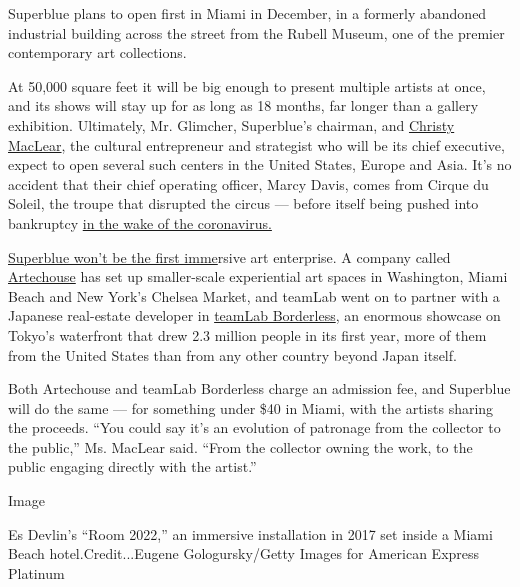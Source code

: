 Superblue plans to open first in Miami in December, in a formerly
abandoned industrial building across the street from the Rubell Museum,
one of the premier contemporary art collections.

At 50,000 square feet it will be big enough to present multiple artists
at once, and its shows will stay up for as long as 18 months, far longer
than a gallery exhibition. Ultimately, Mr. Glimcher, Superblue's
chairman, and \href{https://www.youtube.com/watch?v=_aC5tn6jKzk}{Christy
MacLear}, the cultural entrepreneur and strategist who will be its chief
executive, expect to open several such centers in the United States,
Europe and Asia. It's no accident that their chief operating officer,
Marcy Davis, comes from Cirque du Soleil, the troupe that disrupted the
circus --- before itself being pushed into bankruptcy
\href{https://www.nytimes3xbfgragh.onion/2020/05/17/world/canada/cirque-du-soleil-coronavirus-debt.html}{in
the wake of the coronavirus.}

\href{https://www.nytimes3xbfgragh.onion/2020/05/17/world/canada/cirque-du-soleil-coronavirus-debt.html}{Superblue
won't be the first imme}rsive art enterprise. A company called
\href{https://www.nytimes3xbfgragh.onion/2018/03/14/arts/artechouse-washington-dc-museum.html}{Artechouse}
has set up smaller-scale experiential art spaces in Washington, Miami
Beach and New York's Chelsea Market, and teamLab went on to partner with
a Japanese real-estate developer in
\href{https://borderless.teamlab.art/}{teamLab Borderless}, an enormous
showcase on Tokyo's waterfront that drew 2.3 million people in its first
year, more of them from the United States than from any other country
beyond Japan itself.

Both Artechouse and teamLab Borderless charge an admission fee, and
Superblue will do the same --- for something under \$40 in Miami, with
the artists sharing the proceeds. ``You could say it's an evolution of
patronage from the collector to the public,'' Ms. MacLear said. ``From
the collector owning the work, to the public engaging directly with the
artist.''

Image

Es Devlin's ``Room 2022,'' an immersive installation in 2017 set inside
a Miami Beach hotel.Credit...Eugene Gologursky/Getty Images for American
Express Platinum

